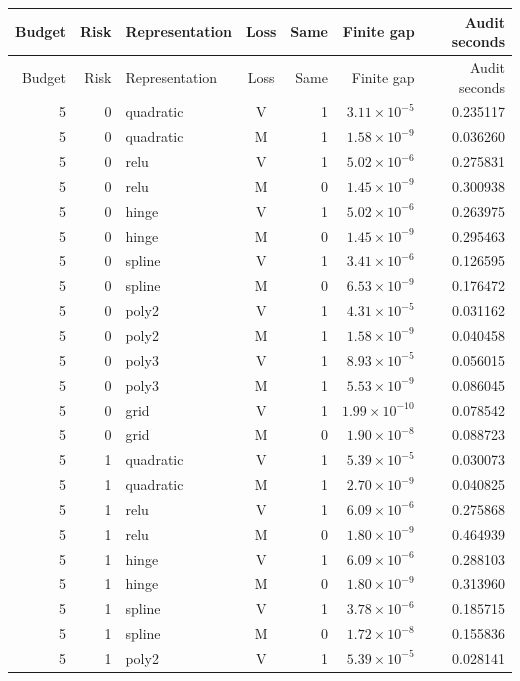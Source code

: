 \begingroup\small

\begin{longtable}{rrlcrrr}
\hline
Budget & Risk & Representation & Loss & Same & Finite gap & Audit seconds \\
\hline\endfirsthead
\hline Budget & Risk & Representation & Loss & Same & Finite gap & Audit seconds \\ \hline\endhead
5 & 0 & quadratic & V & 1 & $3.11\times10^{-5}$ & 0.235117 \\
5 & 0 & quadratic & M & 1 & $1.58\times10^{-9}$ & 0.036260 \\
5 & 0 & relu & V & 1 & $5.02\times10^{-6}$ & 0.275831 \\
5 & 0 & relu & M & 0 & $1.45\times10^{-9}$ & 0.300938 \\
5 & 0 & hinge & V & 1 & $5.02\times10^{-6}$ & 0.263975 \\
5 & 0 & hinge & M & 0 & $1.45\times10^{-9}$ & 0.295463 \\
5 & 0 & spline & V & 1 & $3.41\times10^{-6}$ & 0.126595 \\
5 & 0 & spline & M & 0 & $6.53\times10^{-9}$ & 0.176472 \\
5 & 0 & poly2 & V & 1 & $4.31\times10^{-5}$ & 0.031162 \\
5 & 0 & poly2 & M & 1 & $1.58\times10^{-9}$ & 0.040458 \\
5 & 0 & poly3 & V & 1 & $8.93\times10^{-5}$ & 0.056015 \\
5 & 0 & poly3 & M & 1 & $5.53\times10^{-9}$ & 0.086045 \\
5 & 0 & grid & V & 1 & $1.99\times10^{-10}$ & 0.078542 \\
5 & 0 & grid & M & 0 & $1.90\times10^{-8}$ & 0.088723 \\
5 & 1 & quadratic & V & 1 & $5.39\times10^{-5}$ & 0.030073 \\
5 & 1 & quadratic & M & 1 & $2.70\times10^{-9}$ & 0.040825 \\
5 & 1 & relu & V & 1 & $6.09\times10^{-6}$ & 0.275868 \\
5 & 1 & relu & M & 0 & $1.80\times10^{-9}$ & 0.464939 \\
5 & 1 & hinge & V & 1 & $6.09\times10^{-6}$ & 0.288103 \\
5 & 1 & hinge & M & 0 & $1.80\times10^{-9}$ & 0.313960 \\
5 & 1 & spline & V & 1 & $3.78\times10^{-6}$ & 0.185715 \\
5 & 1 & spline & M & 0 & $1.72\times10^{-8}$ & 0.155836 \\
5 & 1 & poly2 & V & 1 & $5.39\times10^{-5}$ & 0.028141 \\

\end{longtable}
